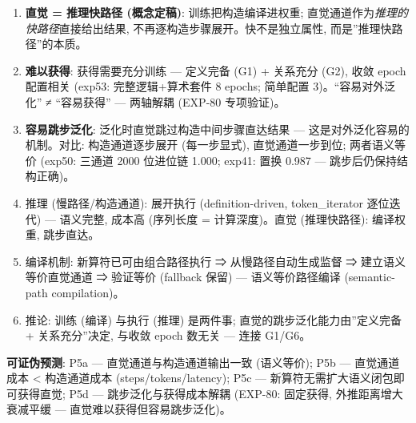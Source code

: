 \documentclass[
]{article}
\providecommand{\tightlist}{%
  \setlength{\itemsep}{0pt}\setlength{\parskip}{0pt}}
\begin{document}
\begin{enumerate}
\def\labelenumi{\arabic{enumi}.}
\tightlist
\item
  \textbf{直觉 = 推理快路径 (概念定稿)}: 训练把构造编译进权重;
  直觉通道作为\emph{推理的快路径}直接给出结果,
  不再逐构造步骤展开。快不是独立属性, 而是''推理快路径''的本质。
\item
  \textbf{难以获得}: 获得需要充分训练 --- 定义完备 (G1) + 关系充分 (G2),
  收敛 epoch 配置相关 (exp53: 完整逻辑+算术套件 8 epochs; 简单配置
  3)。``容易对外泛化'' ≠ ``容易获得'' --- 两轴解耦 (EXP-80 专项验证)。
\item
  \textbf{容易跳步泛化}: 泛化时直觉跳过构造中间步骤直达结果 ---
  这是对外泛化容易的机制。对比: 构造通道逐步展开 (每一步显式),
  直觉通道一步到位; 两者语义等价 (exp50: 三通道 2000 位进位链 1.000;
  exp41: 置换 0.987 --- 跳步后仍保持结构正确)。
\item
  推理 (慢路径/构造通道): 展开执行 (definition-driven, token\_iterator
  逐位迭代) --- 语义完整, 成本高 (序列长度 = 计算深度)。直觉
  (推理快路径): 编译权重, 跳步直达。
\item
  编译机制: 新算符已可由组合路径执行 ⇒ 从慢路径自动生成监督 ⇒
  建立语义等价直觉通道 ⇒ 验证等价 (fallback 保留) --- 语义等价路径编译
  (semantic-path compilation)。
\item
  推论: 训练 (编译) 与执行 (推理) 是两件事;
  直觉的跳步泛化能力由''定义完备 + 关系充分''决定, 与收敛 epoch 数无关
  --- 连接 G1/G6。
\end{enumerate}

\textbf{可证伪预测}: P5a --- 直觉通道与构造通道输出一致 (语义等价); P5b
--- 直觉通道成本 \textless{} 构造通道成本 (steps/tokens/latency); P5c
--- 新算符无需扩大语义闭包即可获得直觉; P5d --- 跳步泛化与获得成本解耦
(EXP-80: 固定获得, 外推距离增大衰减平缓 ---
直觉难以获得但容易跳步泛化)。
\end{document}
